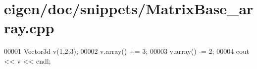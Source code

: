 \hypertarget{eigen_2doc_2snippets_2_matrix_base__array_8cpp_source}{}\section{eigen/doc/snippets/\+Matrix\+Base\+\_\+array.cpp}
\label{eigen_2doc_2snippets_2_matrix_base__array_8cpp_source}

\begin{DoxyCode}
00001 Vector3d v(1,2,3);
00002 v.array() += 3;
00003 v.array() -= 2;
00004 cout << v << endl;
\end{DoxyCode}
